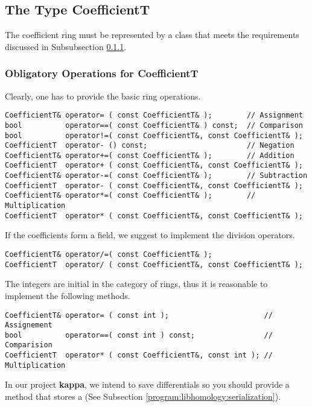 \subsection{The Type CoefficientT}
\label{program:libhomology:CoefficientT}

The coefficient ring must be represented by a class that meets the requirements discussed in Subsubsection \ref{program:libhomology:CoefficientT:obligatory_reqs}.

\subsubsection{Obligatory Operations for CoefficientT}
\label{program:libhomology:CoefficientT:obligatory_reqs}
Clearly, one has to provide the basic ring operations.
\begin{lstlisting}
CoefficientT& operator= ( const CoefficientT& );        // Assignment
bool          operator==( const CoefficientT& ) const;  // Comparison
bool          operator!=( const CoefficientT&, const CoefficientT& );
CoefficientT  operator- () const;                       // Negation
CoefficientT& operator+=( const CoefficientT& );        // Addition
CoefficientT  operator+ ( const CoefficientT&, const CoefficientT& );
CoefficientT& operator-=( const CoefficientT& );        // Subtraction
CoefficientT  operator- ( const CoefficientT&, const CoefficientT& );
CoefficientT& operator*=( const CoefficientT& );        // Multiplication
CoefficientT  operator* ( const CoefficientT&, const CoefficientT& );
\end{lstlisting}
If the coefficients form a field, we suggest to implement the division operators.
\begin{lstlisting}
CoefficientT& operator/=( const CoefficientT& );
CoefficientT  operator/ ( const CoefficientT&, const CoefficientT& );
\end{lstlisting}

The integers are initial in the category of rings, thus it is reasonable to implement the following methods.
\begin{lstlisting}
CoefficientT& operator= ( const int );                      // Assignement
bool          operator==( const int ) const;                // Comparision
CoefficientT  operator* ( const CoefficientT&, const int ); // Multiplication
\end{lstlisting}

In our project {\bfseries kappa}, we intend to save differentials so you should provide a method that stores a  (See Subsection \ref{program:libhomology:serialization}).

